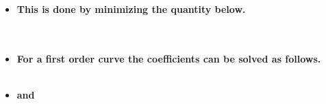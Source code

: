 \documentclass[11pt]{article}
\begin{document}
\begin{itemize}
\begin{itemize}
\begin{itemize}
		\item \textbf{ This is done by minimizing the quantity below.}\\\\ \\
\LARGE
		\item \textbf{ For a first order curve the coefficients can be solved as follows.}\\\\
		\item \textbf{ and}\\\\



	\end{itemize}	
	\end{itemize}

\end{itemize}

	
\end{document}
